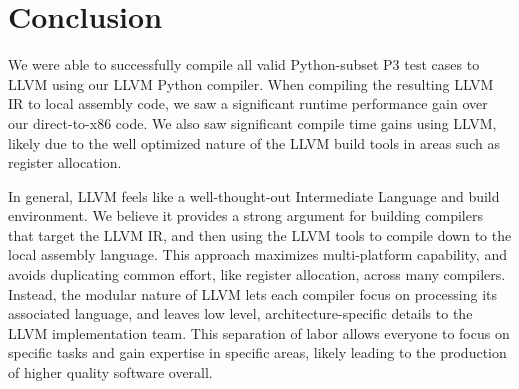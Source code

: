 \documentclass[11pt,twocolumn]{article}
\begin{document}
\section{Conclusion}

We were able to successfully compile all valid Python-subset P3 test
cases to LLVM using our LLVM Python compiler. When compiling the
resulting LLVM IR to local assembly code, we saw a significant runtime
performance gain over our direct-to-x86 code. We also saw significant
compile time gains using LLVM, likely due to the well optimized nature
of the LLVM build tools in areas such as register allocation.

In general, LLVM feels like a well-thought-out Intermediate Language
and build environment. We believe it provides a strong argument for
building compilers that target the LLVM IR, and then using the LLVM
tools to compile down to the local assembly language. This approach
maximizes multi-platform capability, and avoids duplicating common
effort, like register allocation, across many compilers. Instead, the
modular nature of LLVM lets each compiler focus on processing its
associated language, and leaves low level, architecture-specific
details to the LLVM implementation team. This separation of labor
allows everyone to focus on specific tasks and gain expertise in
specific areas, likely leading to the production of higher quality
software overall.

\nocite{*}
\printbibliography
\end{document}
